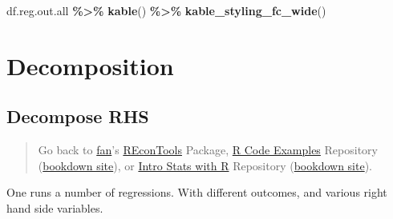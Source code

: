 \documentclass[
]{book}
\newenvironment{Shaded}{\begin{snugshade}}{\end{snugshade}}
\newcommand{\KeywordTok}[1]{\textcolor[rgb]{0.13,0.29,0.53}{\textbf{#1}}}
\newcommand{\NormalTok}[1]{#1}
\newcommand{\OperatorTok}[1]{\textcolor[rgb]{0.81,0.36,0.00}{\textbf{#1}}}
\newcommand{\StringTok}[1]{\textcolor[rgb]{0.31,0.60,0.02}{#1}}
\begin{document}
\begin{Shaded}
\begin{Highlighting}[]
\NormalTok{df.reg.out.all }\OperatorTok{\%\textgreater{}\%}
\StringTok{  }\KeywordTok{kable}\NormalTok{() }\OperatorTok{\%\textgreater{}\%}
\StringTok{  }\KeywordTok{kable\_styling\_fc\_wide}\NormalTok{()}
\end{Highlighting}
\end{Shaded}

\begin{table}[!h]
\centering
{}
\end{table}

\hypertarget{decomposition}{%
\section{Decomposition}\label{decomposition}}

\hypertarget{decompose-rhs}{%
\subsection{Decompose RHS}\label{decompose-rhs}}

\begin{quote}
Go back to \href{http://fanwangecon.github.io/}{fan}'s \href{https://fanwangecon.github.io/REconTools/}{REconTools} Package, \href{https://fanwangecon.github.io/R4Econ/}{R Code Examples} Repository (\href{https://fanwangecon.github.io/R4Econ/bookdown}{bookdown site}), or \href{https://fanwangecon.github.io/Stat4Econ/}{Intro Stats with R} Repository (\href{https://fanwangecon.github.io/Stat4Econ/bookdown}{bookdown site}).
\end{quote}

One runs a number of regressions. With different outcomes, and various right hand side variables.
\end{document}
